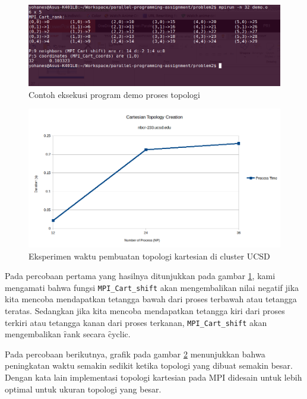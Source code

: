 \begin{figure}
	\centering
	\includegraphics[width=1\textwidth]
	{pics/process_topologies_demo}
	\caption{Contoh eksekusi program demo proses topologi}
	\label{fig:process_topologies_demo}
\end{figure}  

\begin{figure}
	\centering
	\includegraphics[width=1\textwidth]
	{pics/process_topologies_creation_nbcr}
	\caption{Eksperimen waktu pembuatan topologi kartesian di cluster UCSD}
	\label{fig:process_topologies_creation_nbcr}
\end{figure}  

Pada percobaan pertama yang hasilnya ditunjukkan pada gambar \ref{fig:process_topologies_demo}, kami mengamati bahwa fungsi \verb|MPI_Cart_shift| akan mengembalikan nilai negatif jika kita mencoba mendapatkan tetangga bawah dari proses terbawah atau tetangga teratas. Sedangkan jika kita mencoba mendapatkan tetangga kiri dari proses terkiri atau tetangga kanan dari proses terkanan, \verb|MPI_Cart_shift| akan mengembalikan \f{rank} secara \f{cyclic}.

Pada percobaan berikutnya, grafik pada gambar \ref{fig:process_topologies_creation_nbcr} menunjukkan bahwa peningkatan waktu semakin sedikit ketika topologi yang dibuat semakin besar. Dengan kata lain implementasi topologi kartesian pada MPI didesain untuk lebih optimal untuk ukuran topologi yang besar.


